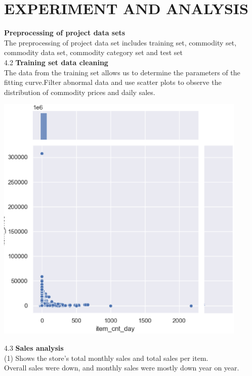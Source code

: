 \section{EXPERIMENT AND ANALYSIS} \label{sec-experiment}
 \textbf{Preprocessing of project data sets}\\
The preprocessing of project data set includes training set, commodity set, commodity data set, commodity category set and test set
\\
4.2 \textbf{Training set data cleaning}\\
The data from the training set allows us to determine the parameters of the fitting curve.Filter abnormal data and use scatter plots to observe the distribution of commodity prices and daily sales.\\
\begin{center}
  \begin{minipage}{0.5\linewidth}
  \centering
  \includegraphics[width=0.9\textwidth]{logos/filter1.eps}
  \end{minipage}
\end{center}
4.3 \textbf{Sales analysis}\\
(1) Shows the store's total monthly sales and total sales per item.\\
Overall sales were down, and monthly sales were mostly down year on year.
